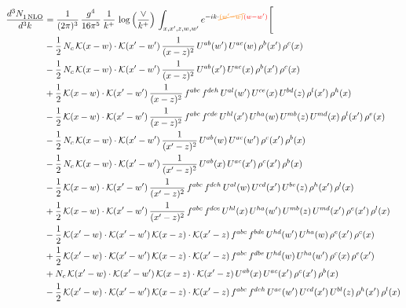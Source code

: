 \documentclass[9pt]{article}
\numberwithin{equation}{section}
\begin{document}
\begin{align}
    \frac{d^{3}N_{1\,\rm NLO}^{\rm}}{d^{3}k}  & = \frac{1}{(2\pi)^{3}}\,\frac{g^{4}}{16\pi^{5}}\,\frac{1}{k^{+}}\,\log{\left(\frac{\vee}{k^{+}}\right)}\, \int_{x,x',z,w,w'}e^{-ik\cdot{\color{orange}\cancel{(w'-w)}}{\color{red}(w-w')}}\Bigg[\notag\\ & 
    -\frac{1}{2}\,N_{c}\,\mathcal{K}(x-w)\cdot\mathcal{K}(x'-w')\,\frac{1}{(x-z)^{2}}\,U^{ab}(w')\,U^{ac}(w)\,\rho^{b}(x')\,\rho^{c}(x)\notag\\
&-\frac{1}{2}\,N_{c}\,\mathcal{K}(x-w)\cdot\mathcal{K}(x'-w')\,\frac{1}{(x-z)^{2}}\,U^{ab}(x')\,U^{ac}(x)\,\rho^{b}(x')\,\rho^{c}(x)\notag\\
&+\frac{1}{2}\,\mathcal{K}(x-w)\cdot\mathcal{K}(x'-w')\,\frac{1}{(x-z)^{2}}\,f^{abc}\,f^{deh}\,U^{al}(w')\,U^{ce}(x)\,U^{bd}(z)\,\rho^{l}(x')\,\rho^{h}(x)\notag\\
&-\frac{1}{2}\,\mathcal{K}(x-w)\cdot\mathcal{K}(x'-w')\,\frac{1}{(x-z)^{2}}\,f^{abc}\,f^{cde}\,U^{hl}(x')\,U^{ha}(w)\,U^{mb}(z)\,U^{md}(x)\,\rho^{l}(x')\,\rho^{e}(x)\notag \\
&-\frac{1}{2}\,N_{c}\,\mathcal{K}(x-w)\cdot\mathcal{K}(x'-w')\,\frac{1}{(x'-z)^{2}}\,U^{ab}(w)\,U^{ac}(w')\,\rho^{c}(x')\,\rho^{b}(x)\notag \\
&-\frac{1}{2}\,N_{c}\,\mathcal{K}(x-w)\cdot\mathcal{K}(x'-w')\,\frac{1}{(x'-z)^{2}}\,U^{ab}(x)\,U^{ac}(x')\,\rho^{c}(x')\,\rho^{b}(x)\notag \\
&-\frac{1}{2}\,\mathcal{K}(x-w)\cdot\mathcal{K}(x'-w')\,\frac{1}{(x'-z)^{2}}\,f^{abc}\,f^{deh}\,U^{al}(w)\,U^{cd}(x')\,U^{be}(z)\,\rho^{h}(x')\,\rho^{l}(x)\notag \\
&+\frac{1}{2}\,\mathcal{K}(x-w)\cdot\mathcal{K}(x'-w')\,\frac{1}{(x'-z)^{2}}\,f^{abc}\,f^{dce}\,U^{hl}(x)\,U^{ha}(w')\,U^{mb}(z)\,U^{md}(x')\,\rho^{e}(x')\,\rho^{l}(x)\notag \\
&-\frac{1}{2}\,\mathcal{K}(x'-w)\cdot\mathcal{K}(x'-w')\,\mathcal{K}(x-z)\cdot\mathcal{K}(x'-z)\,f^{abc}\,f^{bde}\,U^{hd}(w')\,U^{ha}(w)\,\rho^{e}(x')\,\rho^{c}(x)\notag \\
&+\frac{1}{2}\,\mathcal{K}(x'-w)\cdot\mathcal{K}(x'-w')\,\mathcal{K}(x-z)\cdot\mathcal{K}(x'-z)\,f^{abc}\,f^{dbe}\,U^{hd}(w)\,U^{ha}(w')\,\rho^{c}(x)\,\rho^{e}(x')\notag \\
&+N_{c}\,\mathcal{K}(x'-w)\cdot\mathcal{K}(x'-w')\,\mathcal{K}(x-z)\cdot\mathcal{K}(x'-z)\,U^{ab}(x)\,U^{ac}(x')\,\rho^{c}(x')\,\rho^{b}(x)\notag \\
&-\frac{1}{2}\,\mathcal{K}(x'-w)\cdot\mathcal{K}(x'-w')\,\mathcal{K}(x-z)\cdot\mathcal{K}(x'-z)\,f^{abc}\,f^{deh}\,U^{ae}(w')\,U^{cd}(x')\,U^{bl}(z)\,\rho^{h}(x')\,\rho^{l}(x)\notag \\

\end{align}
\end{document}
